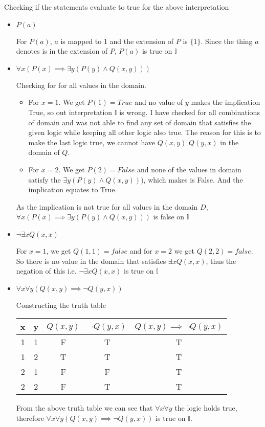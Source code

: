 \documentclass[12pt,a4paper]{article}
\begin{document}
Checking if the statements evaluate to true for the above interpretation
\begin{itemize}
    \item $P(a)$
        
        For $P(a)$, $a$ is mapped to 1 and the extension of $P$ is $\{1\}$. Since the thing $a$ denotes is in the extension of $P$, $P(a)$ is true on $\mathbb{I}$
        
    \item $\forall x(P(x) \implies \exists y(P(y)\land Q(x, y)))$
    
        Checking for for all values in the domain.
        \begin{itemize}
            \item For $x = 1$. We get $P(1) = True$ and no value of $y$ makes the implication True, so out interpretation $\mathbb{I}$ is wrong. I have checked for all combinations of domain and was not able to find any set of domain that satisfies the given logic while keeping all other logic also true. The reason for this is to make the last logic true, we cannot have $Q(x, y)$ $Q(y, x)$ in the domain of $Q$.
            \item For $x = 2$. We get $P(2) = False$ and none of the values in domain satisfy the $\exists y(P(y)\land Q(x, y)))$, which makes is False. And the implication equates to True.
        \end{itemize}
        
        As the implication is not true for all values in the domain $D$, $\forall x(P(x) \implies \exists y(P(y)\land Q(x, y)))$ is false on $\mathbb{I}$
        
    \item $\neg\exists xQ(x, x)$
        
        For $x=1$, we get $Q(1,1) = false$ and for $x=2$ we get $Q(2,2) = false$. So there is no value in the domain that satisfies $\exists xQ(x, x)$, thus the negation of this i.e. $\neg\exists xQ(x, x)$ is true on $\mathbb{I}$
        
    \item $\forall x\forall y(Q(x, y)\implies\neg Q(y, x))$
    
        Constructing the truth table
        
        \begin{tabular}{|c|c|c|c|c|}
            \hline
            x & y & $Q(x, y)$ & $\neg Q(y, x)$ & $Q(x, y)\implies\neg Q(y, x)$\\
            \hline
            1 & 1 & F & T & T\\
            \hline
            1 & 2 & T & T & T\\
            \hline
            2 & 1 & F & F & T\\
            \hline
            2 & 2 & F & T & T\\
            \hline
        \end{tabular}
        
        From the above truth table we can see that $\forall x\forall y$ the logic holds true, therefore $\forall x\forall y(Q(x, y)\implies\neg Q(y, x))$ is true on $\mathbb{I}$.
\end{itemize}
\end{document}
